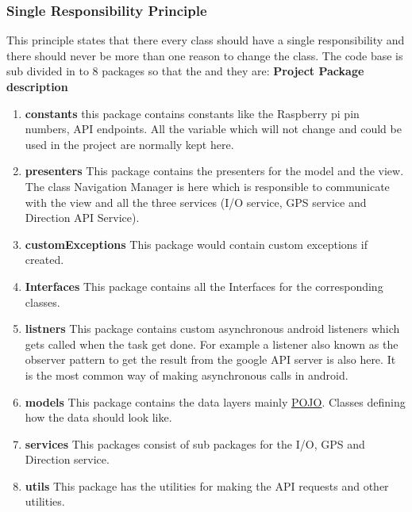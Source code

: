        \subsubsection{Single Responsibility Principle}
        This principle states that there every class should have a single responsibility
        and there should never be more than one reason to change the class. 
        The code base is sub divided in to 8 packages so that the  and they are:
        \newpage
        \textbf{Project Package description}
        \begin{enumerate}
            \item 
                \textbf{constants} 
                    this package contains constants like the Raspberry pi pin 
                    numbers, API endpoints. All the variable which will not 
                    change and could be used in the project are normally kept here.
            \item 
                \textbf{presenters} 
                    This package contains the presenters for the model and the view.
                    The class Navigation Manager is here which is responsible to communicate
                    with the view and all the three services (I/O service, GPS service and 
                    Direction API Service).  
            \item 
                \textbf{customExceptions}
                    This package would contain custom exceptions if created.
            \item 
                \textbf{Interfaces}
                    This package contains all the Interfaces for the corresponding classes. 
            \item 
                \textbf{listners}
                    This package contains custom asynchronous android listeners which gets 
                    called when the task get done. For example a listener also known as the
                    observer pattern \cite{Hotop2015} to get the result
                    from the google API server is also here. It is the most common way of
                    making asynchronous calls in android.
            \item 
                \textbf{models}
                This package contains the data layers mainly 
                \href{https://spring.io/understanding/POJO}  {POJO}. Classes defining how the
                data should look like.
            \item 
                \textbf{services} 
                    This packages consist of sub packages for the I/O, GPS and Direction service.
            \item 
                \textbf{utils}
                    This package has the utilities for making the API requests and other utilities. 
        \end{enumerate}

